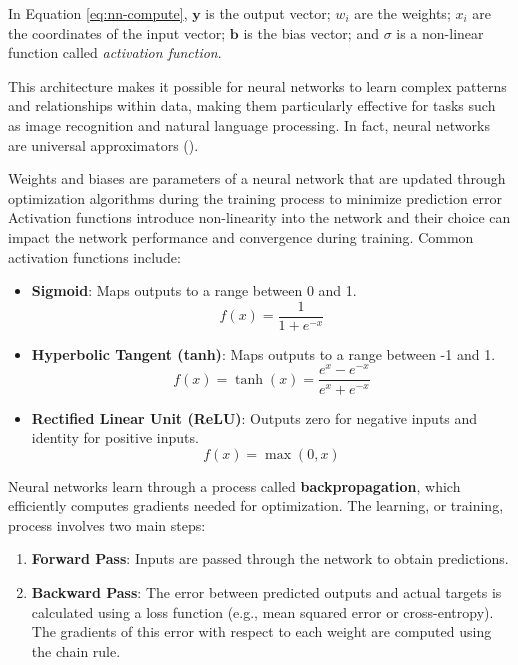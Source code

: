 In Equation \ref{eq:nn-compute}, \(\mathbf{y}\) is the output vector; \(w_i\) are the weights; \(x_i\) are the coordinates of the input vector; \(\mathbf{b}\) is the bias vector; and \(\sigma\) is a non-linear function called \textit{activation function}.

This architecture makes it possible for neural networks to learn complex patterns and relationships within data, making them particularly effective for tasks such as image recognition and natural language processing. In fact, neural networks are universal approximators (\cite{HORNIK1989359,cybenko89}).

Weights and biases are parameters of a neural network that are updated through optimization algorithms during the training process to minimize prediction error Activation functions introduce non-linearity into the network and their choice can impact the network performance and convergence during training. Common activation functions include:

\begin{itemize}
    \item \textbf{Sigmoid}: Maps outputs to a range between 0 and 1.
    \[
    f(x) = \frac{1}{1 + e^{-x}}
    \]
    
    \item \textbf{Hyperbolic Tangent (tanh)}: Maps outputs to a range between -1 and 1.
    \[
    f(x) = \tanh(x) = \frac{e^x - e^{-x}}{e^x + e^{-x}}
    \]
    
    \item \textbf{Rectified Linear Unit (ReLU)}: Outputs zero for negative inputs and identity for positive inputs.
    \[
    f(x) = \max(0, x)
    \]
\end{itemize}

Neural networks learn through a process called \textbf{backpropagation}, which efficiently computes gradients needed for optimization. The learning, or training, process involves two main steps: 

\begin{enumerate}
    \item \textbf{Forward Pass}: Inputs are passed through the network to obtain predictions.
    \item \textbf{Backward Pass}: The error between predicted outputs and actual targets is calculated using a loss function (e.g., mean squared error or cross-entropy). The gradients of this error with respect to each weight are computed using the chain rule.
\end{enumerate}

